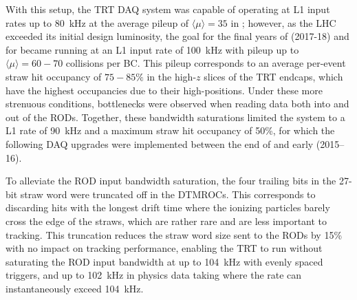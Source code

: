 \documentclass[cernpreprint, atlasdraft=false, UKenglish,british,orcidlogo, texmf, orcidlogo]{atlasdoc}
\begin{document}
With this setup, the \gls{TRT} \gls{DAQ} system was capable of operating at \gls{L1} input rates up to \SI{80}{\kHz} at the average pileup of $\langle \mu \rangle = 35$ in \RunOne; however,
as the \gls{LHC} exceeded its initial design luminosity, the goal for the final years of \RunTwo (2017-18) and for \RunThr became running at an \gls{L1} input rate of \SI{100}{\kilo\Hz} with pileup up to $\langle \mu \rangle = 60 - 70$ \pp collisions per \gls{BC}.
This pileup corresponds to an average per-event straw hit occupancy of $75 - 85\%$ in the high-$z$ slices of the \gls{TRT} endcaps, which have the highest occupancies due to their high-\abseta positions.
Under these more strenuous conditions, bottlenecks were observed when reading data both into and out of the \glspl{ROD}.
Together, these bandwidth saturations limited the system to a \gls{L1} rate of \SI{90}{\kHz} and a maximum straw hit occupancy of 50\%, for which the following \gls{DAQ} upgrades were implemented between the end of \RunOne and early \RunTwo (2015--16).
 
To alleviate the \gls{ROD} input bandwidth saturation, the four trailing bits in the 27-bit straw word were truncated
off in the \glspl{DTMROC}. This corresponds to discarding hits with the longest drift time where the ionizing particles barely cross the edge of the straws, which are rather rare and are less important to tracking. This truncation reduces the straw word size sent to the \glspl{ROD} by 15\% with no impact on tracking performance, enabling the \gls{TRT} to run without saturating the \gls{ROD} input bandwidth at up to \SI{104}{\kHz} with evenly spaced triggers, and up to \SI{102}{\kHz} in physics data taking where the rate can instantaneously exceed \SI{104}{\kHz}.
 
\end{document}
